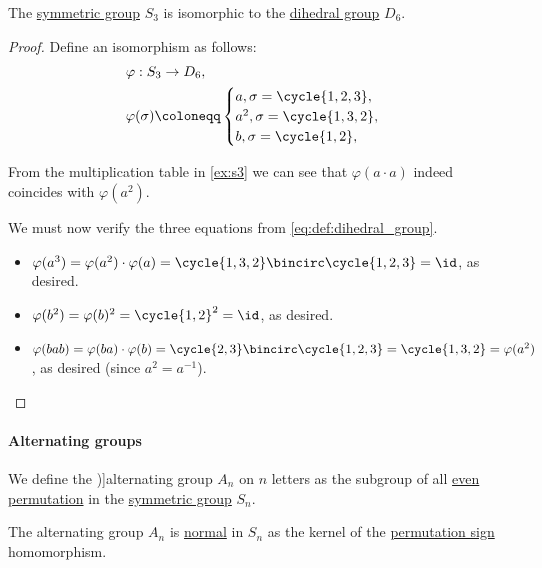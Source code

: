 \begin{proposition}\label{thm:s3_and_d6}
  The \hyperref[def:symmetric_group]{symmetric group} \( S_3 \) is isomorphic to the \hyperref[def:dihedral_group]{dihedral group} \( D_6 \).
\end{proposition}
\begin{proof}
  Define an isomorphism as follows:
  \begin{equation*}
    \begin{aligned}
      &\varphi: S_3 \to D_6, \\
      &\varphi(\sigma) \coloneqq \begin{cases}
        a,   \sigma = \cycle{ 1, 2, 3 }, \\
        a^2, \sigma = \cycle{ 1, 3, 2 }, \\
        b,   \sigma = \cycle{ 1, 2 }, \\
      \end{cases}
    \end{aligned}
  \end{equation*}

  From the multiplication table in \cref{ex:s3} we can see that \( \varphi(a \cdot a) \) indeed coincides with \( \varphi(a^2) \).

  We must now verify the three equations from \eqref{eq:def:dihedral_group}.
  \begin{itemize}
    \item \( \varphi(a^3) = \varphi(a^2) \cdot \varphi(a) = \cycle{ 1, 3, 2 } \bincirc \cycle{ 1, 2, 3 } = \id \), as desired.
    \item \( \varphi(b^2) = \varphi(b)^2 = \cycle{ 1, 2 }^2 = \id \), as desired.
    \item \( \varphi(bab) = \varphi(ba) \cdot \varphi(b) = \cycle{ 2, 3 } \bincirc \cycle{ 1, 2, 3 } = \cycle{ 1, 3, 2 } = \varphi(a^2) \), as desired (since \( a^2 = a^{-1} \)).
  \end{itemize}
\end{proof}

\paragraph{Alternating groups}

\begin{definition}\label{def:alternating_group}
  We define the \term[bg=алтернативна група (\cite[379]{Обрешков1962ВисшаАлгебра})]{alternating group} \( A_n \) on \( n \) letters as the subgroup of all \hyperref[def:permutation_parity]{even permutation} in the \hyperref[def:symmetric_group]{symmetric group} \( S_n \).
\end{definition}
\begin{comments}
  \item The alternating group \( A_n \) is \hyperref[def:normal_subgroup]{normal} in \( S_n \) as the kernel of the \hyperref[def:permutation_parity]{permutation sign} homomorphism.
\end{comments}

